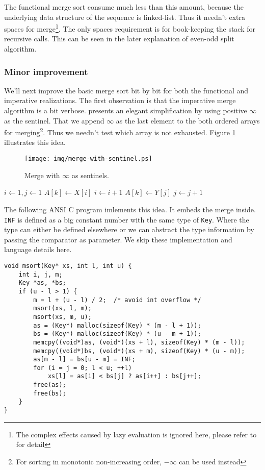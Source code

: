 \documentclass[UTF8]{article}
\begin{document}
The functional merge sort consume much less than this amount, because the underlying data structure
of the sequence is linked-list. Thus it needn't extra spaces for merge\footnote{The complex effects
caused by lazy evaluation is ignored here, please refer to \cite{algo-fp} for detail}.
The only spaces requirement is for book-keeping the stack for recursive calls. This can be
seen in the later explanation of even-odd split algorithm.

\subsubsection{Minor improvement}
We'll next improve the basic merge sort bit by bit for both the functional and imperative realizations.
The first observation is that the imperative merge algorithm is a bit verbose. \cite{CLRS} presents
an elegant simplification by using positive $\infty$ as the sentinel. That we append $\infty$ as
the last element to the both ordered arrays for merging\footnote{For sorting in monotonic non-increasing order,
$-\infty$ can be used instead}. Thus we needn't test which array is not exhausted. Figure \ref{fig:merge-with-sentinel}
illustrates this idea.

\begin{figure}[htbp]
 \centering
 \texttt{[image: img/merge-with-sentinel.ps]}
 \caption{Merge with $\infty$ as sentinels.}
 \label{fig:merge-with-sentinel}
\end{figure}

\begin{algorithmic}[1]
  \State {}
  \State {}
  \State $i \gets 1, j\gets 1$
      \State $A[k] \gets X[i]$
      \State $i \gets i + 1$
    \Else
      \State $A[k] \gets Y[j]$
      \State $j \gets j + 1$
    \EndIf
  \EndFor
\EndProcedure
\end{algorithmic}

The following ANSI C program imlements this idea. It embeds the merge inside. \verb|INF| is defined
as a big constant number with the same type of \verb|Key|. Where the type can either be defined elsewhere
or we can abstract the type information by passing the comparator as parameter. We skip these
implementation and language details here.

\lstset{language=C}
\begin{lstlisting}
void msort(Key* xs, int l, int u) {
    int i, j, m;
    Key *as, *bs;
    if (u - l > 1) {
        m = l + (u - l) / 2;  /* avoid int overflow */
        msort(xs, l, m);
        msort(xs, m, u);
        as = (Key*) malloc(sizeof(Key) * (m - l + 1));
        bs = (Key*) malloc(sizeof(Key) * (u - m + 1));
        memcpy((void*)as, (void*)(xs + l), sizeof(Key) * (m - l));
        memcpy((void*)bs, (void*)(xs + m), sizeof(Key) * (u - m));
        as[m - l] = bs[u - m] = INF;
        for (i = j = 0; l < u; ++l)
            xs[l] = as[i] < bs[j] ? as[i++] : bs[j++];
        free(as);
        free(bs);
    }
}
\end{lstlisting}
\end{document}
